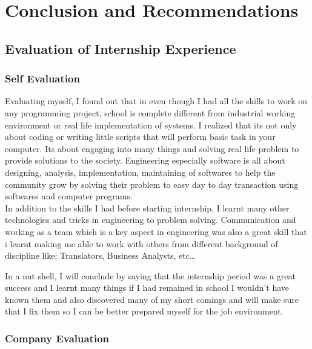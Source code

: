 
\chapter{Conclusion and Recommendations} %

\label{Chapter5} %


\section{Evaluation of Internship Experience}

\subsection{Self Evaluation}

Evaluating myself, I found out that in even though I had all the skills to work on any programming project, school is complete different from industrial working environment or real life implementation of systems. I realized that its not only about coding or writing little scripts that will perform basic task in your computer. Its about engaging into many things and solving real life problem to provide solutions to the society. Engineering especially software is all about designing, analysis, implementation, maintaining of softwares to help the community grow by solving their problem to easy day to day transaction using softwares and computer programs. \\

In addition to the skills I had before starting internship, I learnt many other technologies and tricks in engineering to problem solving. Communication and working as a team which is a key aspect in engineering was also a great skill that i learnt making me able to work with others from different background of discipline like; Translators, Business Analysts, etc\ldots

In a nut shell, I will conclude by saying that the internship period was a great success and I learnt many things if I had remained in school I wouldn't have known them and also discovered many of my short comings and will make sure that I fix them so I can be better prepared myself for the job environment.

\subsection{Company Evaluation}

